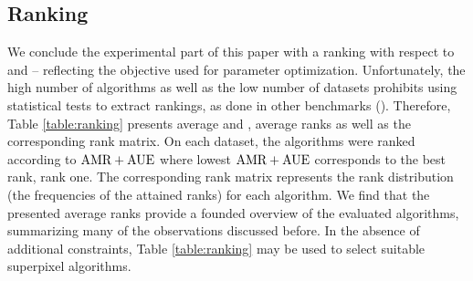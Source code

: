 \subsection{Ranking}
\label{subsec:experiments-ranking}

We conclude the experimental part of this paper with a ranking with respect to \ARec and \AUE
 -- reflecting the objective used for parameter optimization. Unfortunately, the high number
of algorithms as well as the low number of datasets prohibits using statistical
tests to extract rankings, as done in other benchmarks (\eg \cite{Demsar:2006,DollarWojekSchielePerona:2009}).
Therefore, Table \ref{table:ranking} presents average \ARec and \AUE, average ranks
as well as the corresponding rank matrix.
On each dataset, the algorithms were ranked according to $\text{AMR} + \text{AUE}$ where
lowest $\text{AMR} + \text{AUE}$ corresponds to the best rank, \ie rank one.
The corresponding rank matrix represents the rank distribution
(\ie the frequencies of the attained ranks) for each algorithm.
We find that the presented average ranks provide a founded overview of the evaluated 
algorithms, summarizing many of the observations discussed before.
In the absence of additional constraints, Table \ref{table:ranking}
may be used to select suitable superpixel algorithms.